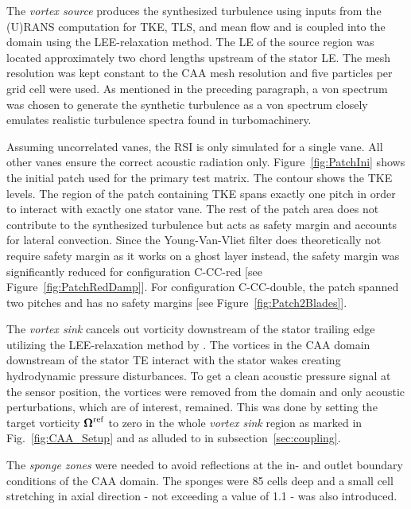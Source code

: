 \begin{description}
\item{The \textit{vortex source}} produces the synthesized turbulence using inputs from the (U)RANS computation for TKE, TLS, and mean flow and is coupled into the domain using the LEE-relaxation method.  The LE of the source region was located approximately two chord lengths upstream of the stator LE.  The mesh resolution was kept constant to the CAA mesh resolution and five particles per grid cell were used.  As mentioned in the preceding paragraph, a von \Karman spectrum was chosen to generate the synthetic turbulence as a von \Karman spectrum closely emulates realistic turbulence spectra found in turbomachinery. 

Assuming uncorrelated vanes, the RSI is only simulated for a single vane.  All other vanes ensure the correct acoustic radiation only.  Figure~\ref{fig:PatchIni} shows the initial patch used for the primary test matrix.  The contour shows the TKE levels.  The region of the patch containing TKE spans exactly one pitch in order to interact with exactly one stator vane.  The rest of the patch area does not contribute to the synthesized turbulence but acts as safety margin and accounts for lateral convection.  Since the Young-Van-Vliet filter does theoretically not require safety margin as it works on a ghost layer instead, the safety margin was significantly reduced for configuration C-CC-red [see Figure~\ref{fig:PatchRedDamp}].  For configuration C-CC-double, the patch spanned two pitches and has no safety margins [see Figure~\ref{fig:Patch2Blades}].      	



\item{The \textit{vortex sink}} cancels out vorticity downstream of the stator trailing edge utilizing the LEE-relaxation method by \citet{ewert_linear-_2014}.  The vortices in the CAA domain downstream of the stator TE interact with the stator wakes creating hydrodynamic pressure disturbances.  To get a clean acoustic pressure signal at the sensor position, the vortices were removed from the domain and only acoustic perturbations, which are of interest, remained.  This was done by setting the target vorticity $\boldsymbol{\Omega}^\text{ref}$ to zero in the whole \textit{vortex sink} region as marked in Fig.~\ref{fig:CAA_Setup} and as alluded to in subsection~\ref{sec:coupling}.  

\item{The \textit{sponge zones}} were needed to avoid reflections at the in- and outlet boundary conditions of the CAA domain.  The sponges were 85 cells deep and a small cell stretching in axial direction - not exceeding a value of 1.1 -  was also introduced.


\end{description}
